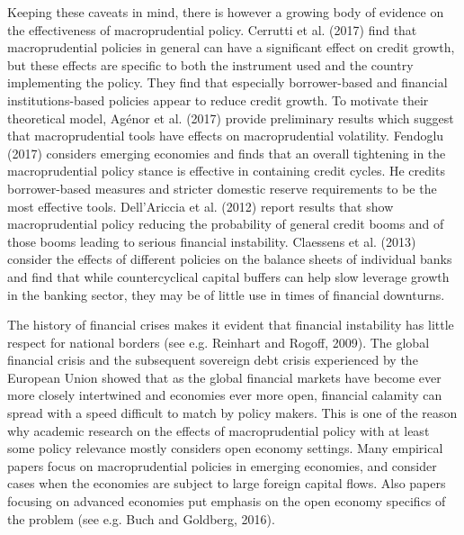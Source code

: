 \documentclass[12pt,a4paper]{article}
\begin{document}
Keeping these caveats in mind, there is however a growing body of evidence on the effectiveness of macroprudential policy. Cerrutti et al. (2017) find that macroprudential policies in general can have a significant effect on credit growth, but these effects are specific to both the instrument used and the country implementing the policy. They find that especially borrower-based and financial institutions-based policies appear to reduce credit growth. To motivate their theoretical model, Agénor et al. (2017) provide preliminary results which suggest that macroprudential tools have effects on macroprudential volatility. Fendoglu (2017) considers emerging economies and finds that an overall tightening in the macroprudential policy stance is effective in containing credit cycles. He credits borrower-based measures and stricter domestic reserve requirements to be the most effective tools. Dell’Ariccia et al. (2012) report results that show macroprudential policy reducing the probability of general credit booms and of those booms leading to serious financial instability. Claessens et al. (2013) consider the effects of different policies on the balance sheets of individual banks and find that while countercyclical capital buffers can help slow leverage growth in the banking sector, they may be of little use in times of financial downturns. %

The history of financial crises makes it evident that financial instability has little respect for national borders (see e.g. Reinhart and Rogoff, 2009). The global financial crisis and the subsequent sovereign debt crisis experienced by the European Union showed that as the global financial markets have become ever more closely intertwined and economies ever more open, financial calamity can spread with a speed difficult to match by policy makers. This is one of the reason why academic research on the effects of macroprudential policy with at least some policy relevance mostly considers open economy settings. Many empirical papers focus on macroprudential policies in emerging economies, and consider cases when the economies are subject to large foreign capital flows. Also papers focusing on advanced economies put emphasis on the open economy specifics of the problem (see e.g. Buch and Goldberg, 2016).
\end{document}
